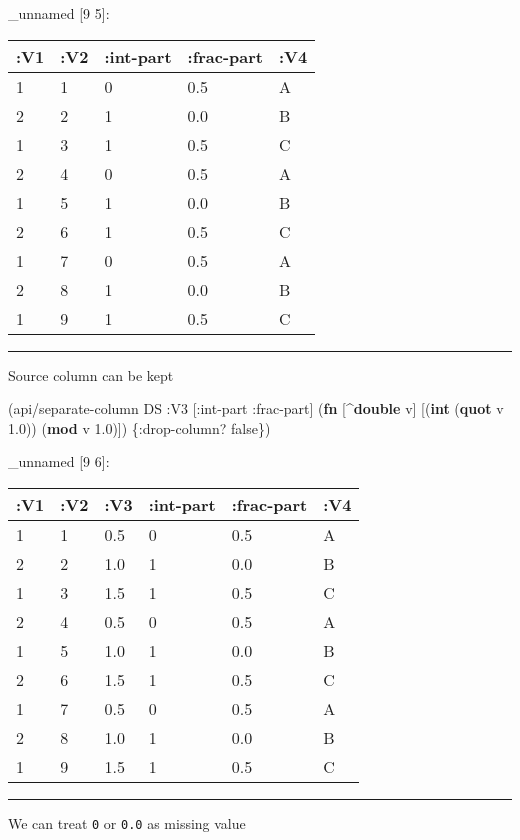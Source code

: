 \documentclass[]{article}
\newenvironment{Shaded}{\begin{snugshade}}{\end{snugshade}}
\newcommand{\AttributeTok}[1]{\textcolor[rgb]{0.77,0.63,0.00}{#1}}
\newcommand{\FloatTok}[1]{\textcolor[rgb]{0.00,0.00,0.81}{#1}}
\newcommand{\KeywordTok}[1]{\textcolor[rgb]{0.13,0.29,0.53}{\textbf{#1}}}
\newcommand{\NormalTok}[1]{#1}
\newcommand{\VariableTok}[1]{\textcolor[rgb]{0.00,0.00,0.00}{#1}}
\begin{document}
\_unnamed {[}9 5{]}:

\begin{longtable}[]{@{}lllll@{}}
\toprule
:V1 & :V2 & :int-part & :frac-part & :V4\tabularnewline
\midrule
\endhead
1 & 1 & 0 & 0.5 & A\tabularnewline
2 & 2 & 1 & 0.0 & B\tabularnewline
1 & 3 & 1 & 0.5 & C\tabularnewline
2 & 4 & 0 & 0.5 & A\tabularnewline
1 & 5 & 1 & 0.0 & B\tabularnewline
2 & 6 & 1 & 0.5 & C\tabularnewline
1 & 7 & 0 & 0.5 & A\tabularnewline
2 & 8 & 1 & 0.0 & B\tabularnewline
1 & 9 & 1 & 0.5 & C\tabularnewline
\bottomrule
\end{longtable}

\begin{center}\rule{0.5\linewidth}{0.5pt}\end{center}

Source column can be kept

\begin{Shaded}
\begin{Highlighting}[]
\NormalTok{(api/separate-column DS }\AttributeTok{:V3}\NormalTok{ [}\AttributeTok{:int-part} \AttributeTok{:frac-part}\NormalTok{] (}\KeywordTok{fn}\NormalTok{ [^}\KeywordTok{double}\NormalTok{ v]}
\NormalTok{                                                     [(}\KeywordTok{int}\NormalTok{ (}\KeywordTok{quot}\NormalTok{ v }\FloatTok{1.0}\NormalTok{))}
\NormalTok{                                                      (}\KeywordTok{mod}\NormalTok{ v }\FloatTok{1.0}\NormalTok{)]) \{}\AttributeTok{:drop-column}\NormalTok{? }\VariableTok{false}\NormalTok{\})}
\end{Highlighting}
\end{Shaded}

\_unnamed {[}9 6{]}:

\begin{longtable}[]{@{}llllll@{}}
\toprule
:V1 & :V2 & :V3 & :int-part & :frac-part & :V4\tabularnewline
\midrule
\endhead
1 & 1 & 0.5 & 0 & 0.5 & A\tabularnewline
2 & 2 & 1.0 & 1 & 0.0 & B\tabularnewline
1 & 3 & 1.5 & 1 & 0.5 & C\tabularnewline
2 & 4 & 0.5 & 0 & 0.5 & A\tabularnewline
1 & 5 & 1.0 & 1 & 0.0 & B\tabularnewline
2 & 6 & 1.5 & 1 & 0.5 & C\tabularnewline
1 & 7 & 0.5 & 0 & 0.5 & A\tabularnewline
2 & 8 & 1.0 & 1 & 0.0 & B\tabularnewline
1 & 9 & 1.5 & 1 & 0.5 & C\tabularnewline
\bottomrule
\end{longtable}

\begin{center}\rule{0.5\linewidth}{0.5pt}\end{center}

We can treat \texttt{0} or \texttt{0.0} as missing value
\end{document}
